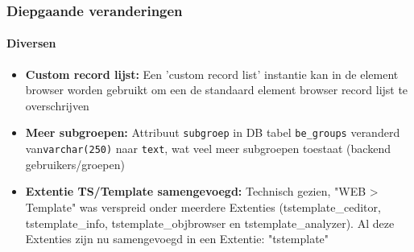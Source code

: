 
\begin{frame}[fragile]
	\frametitle{Diepgaande veranderingen}
	\framesubtitle{Diversen}

	\begin{itemize}

		\item \textbf{Custom record lijst:}\newline
			\small
				Een 'custom record list' instantie kan in de element browser worden gebruikt om een de standaard element browser record lijst te overschrijven
			\normalsize

		\item \textbf{Meer subgroepen:}\newline
			\small
				Attribuut \texttt{subgroep} in DB tabel \texttt{be\_groups} veranderd van\texttt{varchar(250)} naar \texttt{text}, wat veel meer subgroepen toestaat (backend gebruikers/groepen)
			\normalsize

		\item \textbf{Extentie TS/Template samengevoegd:}\newline
			\small
				Technisch gezien, "WEB > Template" was verspreid onder meerdere Extenties (tstemplate\_ceditor, tstemplate\_info,
tstemplate\_objbrowser en tstemplate\_analyzer). Al deze Extenties zijn nu samengevoegd in een Extentie: "tstemplate"
			\normalsize

	\end{itemize}
	
\end{frame}



